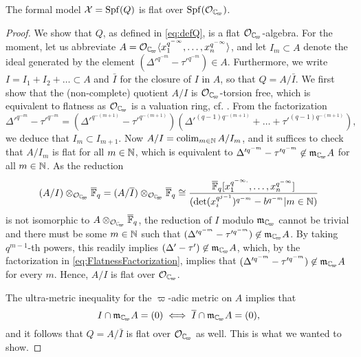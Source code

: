 \documentclass[../main.tex]{subfiles}
\begin{document}
\begin{prop}\label{prop:FlatnessOfFormalModel}
  The formal model $\mathcal{X} = \operatorname{Spf}(Q)$ is flat over $\spf(\cO_\Cp)$. 
\begin{proof}
  We show that $Q$, as defined in \eqref{eq:defQ}, is a flat $\cO_\Cp$-algebra.
  For the moment, let us abbreviate $A = \cO_\Cp\langle x_1^{q^{-\infty}}, \dots, 
  x_n^{q^{-\infty}}\rangle$, 
  and let $I_m \subset A$ denote the ideal generated by the element 
  $(\Delta'^{q^{-m}} - \tau'^{q^{-m}}) \in A$. Furthermore, we write $I = I_1 +
  I_2 + \dots \subset A$ 
  and $\bar I$ for the closure of $I$ in $A$, so that $Q = A/\bar I$. 
  We first show that the (non-complete) quotient $A/I$ is $\cO_\Cp$-torsion free, 
  which is equivalent to flatness as $\cO_\Cp$ is a valuation ring,
  cf. \cite[\href{https://stacks.math.columbia.edu/tag/0539}{Tag
  0539}]{stacks-project}. From the factorization 
  \begin{equation}\label{eq:FlatnessFactorization}
    \Delta'^{q^{-m}} - \tau'^{q^{-m}} = (\Delta'^{q^{-(m+1)}} - \tau'^{q^{-(m+1)}})
    (\Delta'^{(q-1)q^{-(m+1)}} + \dots + \tau'^{(q-1)q^{-(m+1)}}),
  \end{equation}
  we deduce that $I_{m} \subset I_{m+1}$. Now $A/I = \operatorname*{colim}_{m \in \mathbb{N}} A/I_m$, and
  it suffices to check that $A/I_m$ is flat for all $m \in \mathbb{N}$, which is equivalent
  to $\Delta'^{q^{-m}} - \tau'^{q^{-m}} \not \in \fm_\Cp A$ for all
  $m \in \mathbb{N}$. As the reduction
  $$(A/I) \otimes_{\cO_\Cp} \Fqbar = (A/\bar I) \otimes_{\cO_\Cp}
  \Fqbar \cong \frac{\Fqbar [x_1^{q^{-\infty,}}, \dots,
    x_n^{q^{-\infty}}]}{(\det(x_i^{q^{j-1}})^{q^{-m}}- b^{q^{-m}} | m \in \N)}$$
  is not isomorphic to $A \otimes_{\cO_\Cp} \Fqbar$, the reduction of $I$ modulo
  $\fm_\Cp$ cannot be trivial and there must be some 
  $m \in \mathbb{N}$ such that $(\Delta'^{q^{-m}} - \tau'^{q^{-m}}) \not \in \fm_\Cp A$. 
  By taking $q^{m-1}$-th powers, this readily implies $(\Delta' - \tau') \not \in
  \fm_\Cp A$, which, by the factorization in \eqref{eq:FlatnessFactorization},
  implies that $(\Delta'^{q^{-m}} - \tau'^{q^{-m}}) \not \in \fm_\Cp A$ for every $m$. 
  Hence, $A/I$ is flat over $\cO_\Cp$. 

  The ultra-metric inequality for the $\varpi$-adic metric on $A$ implies that 
  \begin{equation*}
    I \cap \fm_\Cp A = (0) \iff \bar I \cap \fm_\Cp A = (0),
  \end{equation*}
  and it follows that $Q = A/\bar I$ is flat over $\cO_\Cp$ as well. 
  This is what we wanted to show.
\end{proof}
\end{prop}
\end{document}
